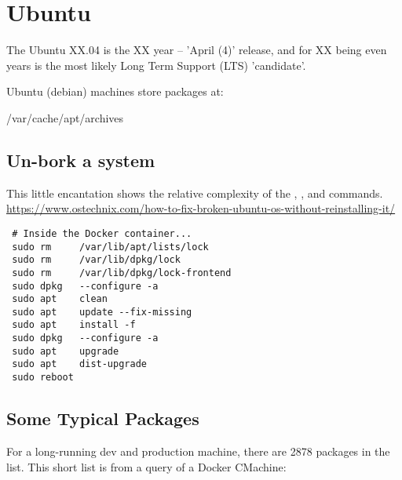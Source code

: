 \section{Ubuntu}

The Ubuntu XX.04 is the XX year -- 'April (4)' release, and for XX being
even years is the most likely Long Term Support (LTS) 'candidate'.

Ubuntu (debian) machines store packages at:

/var/cache/apt/archives

\subsection{Un-bork a system}

This little encantation shows the relative complexity 
of the , , and  commands.
\url{https://www.ostechnix.com/how-to-fix-broken-ubuntu-os-without-reinstalling-it/}

\begin{tcolorbox}[colback=yellow!5!black]
\begingroup \fontsize{10pt}{10pt}
\selectfont
\begin{verbatim} 
 # Inside the Docker container...
 sudo rm     /var/lib/apt/lists/lock
 sudo rm     /var/lib/dpkg/lock
 sudo rm     /var/lib/dpkg/lock-frontend
 sudo dpkg   --configure -a
 sudo apt    clean
 sudo apt    update --fix-missing
 sudo apt    install -f
 sudo dpkg   --configure -a
 sudo apt    upgrade
 sudo apt    dist-upgrade
 sudo reboot 
\end{verbatim}
\endgroup
\end{tcolorbox}
\subsection{Some Typical Packages}

For a long-running dev and production machine, there are 2878 packages
in the list. This short list is from a query of a Docker CMachine:

